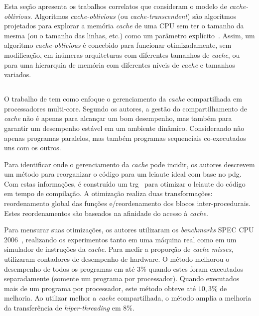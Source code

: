 Esta seção apresenta os trabalhos correlatos que consideram o modelo de \textit{cache-oblivious}.
Algoritmos \textit{cache-oblivious} (ou \textit{cache-tran\-scen\-dent}) são algoritmos projetados para explorar a memória \textit{cache} de uma CPU sem ter o tamanho da mesma (ou o tamanho das linhas, etc.) como um parâmetro explícito~\cite{frigo1999cache}. Assim, um algoritmo \textit{cache-oblivious} é concebido para funcionar otimizadamente, sem modificação, em inúmeras arquiteturas com diferentes tamanhos de \textit{cache}, ou para uma hierarquia de memória com diferentes níveis de \textit{cache} e tamanhos variados.

\subsection{}

O trabalho de  tem como enfoque o gerenciamento da \textit{cache} compartilhada em processadores multi-core.
Segundo os autores, a gestão do compartilhamento de \textit{cache} não é apenas para alcançar um bom desempenho, mas também para garantir um desempenho estável em um ambiente dinâmico. Considerando não apenas programas paralelos, mas também programas sequenciais co-executados uns com os outros.

Para identificar onde o gerenciamento da \textit{cache} pode incidir, os autores descrevem um método para reorganizar o código para um leiaute ideal com base no \ac{pdg}.
Com estas informações, é construído um \ac{trg}~\cite{gloy1999procedure} para otimizar o leiaute do código em tempo de compilação.
A otimização realiza duas transformações: reordenamento global das funções e\@/\@ou reordenamento dos blocos inter-procedurais. Estes reordenamentos são baseados na afinidade do acesso à \textit{cache}.

Para mensurar suas otimizações, os autores utilizaram os \textit{benchmarks} SPEC CPU 2006~\cite{spec2006}, realizando os experimentos tanto em uma máquina real como em um simulador de instruções da \textit{cache}. Para medir a proporção de \textit{cache misses}, utilizaram contadores de desempenho de hardware.
O método melhorou o desempenho de todos os programas em até $3\%$ quando estes foram executados separadamente (somente um programa por processador).
Quando executados mais de um programa por processador, este método obteve até $10,3\%$ de melhoria. Ao utilizar melhor a \textit{cache} compartilhada, o método amplia a melhoria da transferência de \textit{hiper-threading} em $8\%$.

